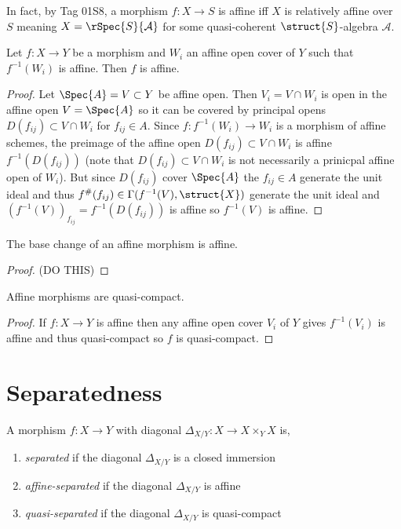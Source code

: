 \documentclass[12pt]{article}
\begin{document}
\begin{rmk}
In fact, by Tag 01S8, a morphism $f : X \to S$ is affine iff $X$ is relatively affine over $S$ meaning $X = \rSpec{S}{\mathcal{A}}$ for some quasi-coherent $\struct{S}$-algebra $\mathcal{A}$. 
\end{rmk}

\begin{lemma}
Let $f : X \to Y$ be a morphism and $W_i$ an affine open cover of $Y$ such that $f^{-1}(W_i)$ is affine. Then $f$ is affine.
\end{lemma}

\begin{proof}
Let $\Spec{A} = V \subset Y$ be affine open. Then $V_i = V \cap W_i$ is open in the affine open $V = \Spec{A}$ so it can be covered by principal opens $D(f_{ij}) \subset V \cap W_i$ for $f_{ij} \in A$. Since $f : f^{-1}(W_i) \to W_i$ is a morphism of affine schemes, the preimage of the affine open $D(f_{ij}) \subset V \cap W_i$ is affine $f^{-1}(D(f_{ij}))$ (note that $D(f_{ij}) \subset V \cap W_i$ is not necessarily a prinicpal affine open of $W_i$). But since $D(f_{ij})$ cover $\Spec{A}$ the $f_{ij} \in A$ generate the unit ideal and thus $f^\#(f_{ij}) \in \Gamma(f^{-1}(V), \struct{X})$ generate the unit ideal and $(f^{-1}(V))_{f_{ij}} = f^{-1}(D(f_{ij}))$ is affine so $f^{-1}(V)$ is affine.
\end{proof}

\begin{lemma}
The base change of an affine morphism is affine. 
\end{lemma}

\begin{proof}
(DO THIS)
\end{proof}


\begin{lemma}
Affine morphisms are quasi-compact.
\end{lemma}

\begin{proof}
If $f : X \to Y$ is affine then any affine open cover $V_i$ of $Y$ gives $f^{-1}(V_i)$ is affine and thus quasi-compact so $f$ is quasi-compact. 
\end{proof}



\section{Separatedness}

\begin{defn}
A morphism $f : X \to Y$ with diagonal $\Delta_{X/Y} : X \to X \times_Y X$ is,
\begin{enumerate}
\item \textit{separated} if the diagonal $\Delta_{X/Y}$ is a closed immersion
\item \textit{affine-separated} if the diagonal $\Delta_{X/Y}$ is affine
\item \textit{quasi-separated} if the diagonal $\Delta_{X/Y}$ is quasi-compact
\end{enumerate}
\end{defn}
\end{document}
